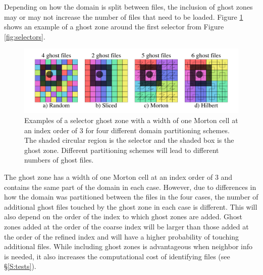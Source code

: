 \documentclass[apjl]{emulateapj}
\begin{document}
Depending on how the domain is split between files, the inclusion of ghost zones may or may not increase the number of files that need to be loaded. Figure \ref{fig:ghosts} shows an example of a ghost zone around the first selector from Figure \ref{fig:selectors}. 
%
\begin{figure}[htbp]
\begin{center}
\includegraphics[width=\columnwidth,keepaspectratio]{../images/ghosts.png}
\caption{Examples of a selector ghost zone with a width of one Morton cell at an index order of 3 for  four different domain partitioning schemes. The shaded circular region is the selector and the shaded box is the ghost zone. Different partitioning schemes will lead to different numbers of ghost files.}
\label{fig:ghosts}
\end{center}
\end{figure}
%
The ghost zone has a width of one Morton cell at an index order of 3 and contains the same part of the domain in each case. However, due to differences in how the domain was partitioned between the files in the four cases, the number of additional ghost files touched by the ghost zone in each case is different. This will also depend on the order of the index to which ghost zones are added. Ghost zones added at the order of the coarse index will be larger than those added at the order of the refined index and will have a higher probability of touching additional files. While including ghost zones is advantageous when neighbor info is needed, it also increases the computational cost of identifying files (see \S\ref{S:tests}). 

\end{document}
